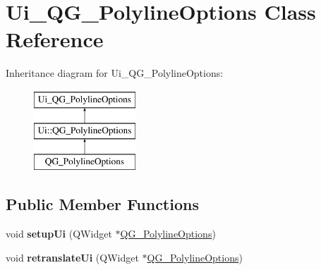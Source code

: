 \hypertarget{classUi__QG__PolylineOptions}{\section{Ui\-\_\-\-Q\-G\-\_\-\-Polyline\-Options Class Reference}
\label{classUi__QG__PolylineOptions}
}
Inheritance diagram for Ui\-\_\-\-Q\-G\-\_\-\-Polyline\-Options\-:\begin{figure}[H]
\begin{center}
\leavevmode
\includegraphics[height=3.000000cm]{classUi__QG__PolylineOptions}
\end{center}
\end{figure}
\subsection*{Public Member Functions}
\begin{DoxyCompactItemize}
\item 
\hypertarget{classUi__QG__PolylineOptions_af129b3f213b4e2d88cbcffa76bf4af89}{void {\bfseries setup\-Ui} (Q\-Widget $\ast$\hyperlink{classQG__PolylineOptions}{Q\-G\-\_\-\-Polyline\-Options})}\label{classUi__QG__PolylineOptions_af129b3f213b4e2d88cbcffa76bf4af89}

\item 
\hypertarget{classUi__QG__PolylineOptions_af8e82a392471373c41c68613c2d7e50f}{void {\bfseries retranslate\-Ui} (Q\-Widget $\ast$\hyperlink{classQG__PolylineOptions}{Q\-G\-\_\-\-Polyline\-Options})}\label{classUi__QG__PolylineOptions_af8e82a392471373c41c68613c2d7e50f}

\end{DoxyCompactItemize}
